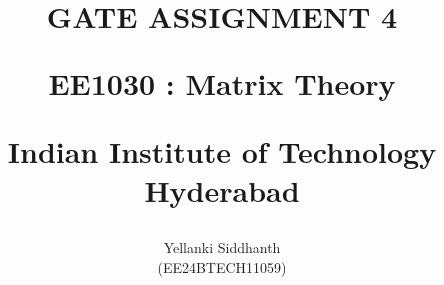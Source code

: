 \documentclass[journal]{IEEEtran}
\begin{document}

\onecolumn
\title{
GATE ASSIGNMENT 4

\large{EE1030 : Matrix Theory}

Indian Institute of Technology Hyderabad
}
\author{Yellanki Siddhanth

(EE24BTECH11059)
}	




\maketitle





\bigskip

\renewcommand{\thefigure}{\theenumi}
\renewcommand{\thetable}{\theenumi}
 
\end{document}
